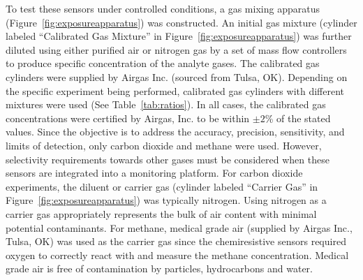 \documentclass[times]{joehreview}
\begin{document}
	To test these sensors under controlled conditions, a gas mixing apparatus (Figure~\ref{fig:exposureapparatus}) was constructed.  An initial gas mixture (cylinder labeled ``Calibrated Gas Mixture'' in Figure~\ref{fig:exposureapparatus}) was further diluted using either purified air or nitrogen gas by a set of mass flow controllers to produce specific concentration of the analyte gases.  The calibrated gas cylinders were supplied by Airgas Inc. (sourced from Tulsa, OK).  Depending on the specific experiment being performed, calibrated gas cylinders with different mixtures were used (See Table~\ref{tab:ratios}).  In all cases, the calibrated gas concentrations were certified by Airgas, Inc. to be within $\pm 2$\% of the stated values.  Since the objective is to address the accuracy, precision, sensitivity, and limits of detection, only carbon dioxide and methane were used.  However, selectivity requirements towards other gases must be considered when these sensors are integrated into a monitoring platform.  For carbon dioxide experiments, the diluent or carrier gas (cylinder labeled ``Carrier Gas'' in Figure~\ref{fig:exposureapparatus}) was typically nitrogen.  Using nitrogen as a carrier gas appropriately represents the bulk of air content with minimal potential contaminants.  For methane, medical grade air (supplied by Airgas Inc., Tulsa, OK) was used as the carrier gas since the chemiresistive sensors required oxygen to correctly react with and measure the methane concentration.  Medical grade air is free of contamination by particles, hydrocarbons and water.
	
\end{document}
